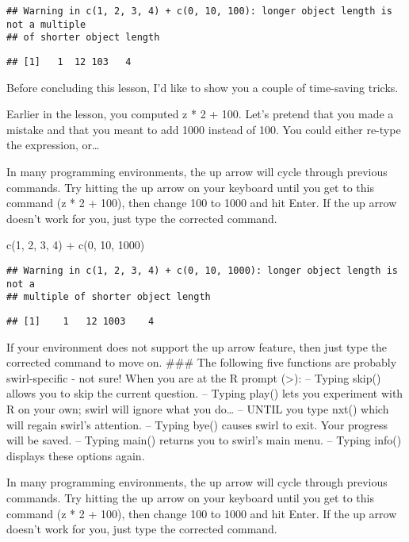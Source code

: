 \documentclass[
]{article}
\newenvironment{Shaded}{\begin{snugshade}}{\end{snugshade}}
\newcommand{\DecValTok}[1]{\textcolor[rgb]{0.00,0.00,0.81}{#1}}
\newcommand{\FunctionTok}[1]{\textcolor[rgb]{0.00,0.00,0.00}{#1}}
\newcommand{\NormalTok}[1]{#1}
\newcommand{\SpecialCharTok}[1]{\textcolor[rgb]{0.00,0.00,0.00}{#1}}
\begin{document}
\begin{verbatim}
## Warning in c(1, 2, 3, 4) + c(0, 10, 100): longer object length is not a multiple
## of shorter object length
\end{verbatim}

\begin{verbatim}
## [1]   1  12 103   4
\end{verbatim}

Before concluding this lesson, I'd like to show you a couple of
time-saving tricks.

Earlier in the lesson, you computed z * 2 + 100. Let's pretend that you
made a mistake and that you meant to add 1000 instead of 100. You could
either re-type the expression, or\ldots{}

In many programming environments, the up arrow will cycle through
previous commands. Try hitting the up arrow on your keyboard until you
get to this command (z * 2 + 100), then change 100 to 1000 and hit
Enter. If the up arrow doesn't work for you, just type the corrected
command.

\begin{Shaded}
\begin{Highlighting}[]
\FunctionTok{c}\NormalTok{(}\DecValTok{1}\NormalTok{, }\DecValTok{2}\NormalTok{, }\DecValTok{3}\NormalTok{, }\DecValTok{4}\NormalTok{) }\SpecialCharTok{+} \FunctionTok{c}\NormalTok{(}\DecValTok{0}\NormalTok{, }\DecValTok{10}\NormalTok{, }\DecValTok{1000}\NormalTok{)}
\end{Highlighting}
\end{Shaded}

\begin{verbatim}
## Warning in c(1, 2, 3, 4) + c(0, 10, 1000): longer object length is not a
## multiple of shorter object length
\end{verbatim}

\begin{verbatim}
## [1]    1   12 1003    4
\end{verbatim}

If your environment does not support the up arrow feature, then just
type the corrected command to move on. \#\#\# The following five
functions are probably swirl-specific - not sure! When you are at the R
prompt (\textgreater): -- Typing skip() allows you to skip the current
question. -- Typing play() lets you experiment with R on your own; swirl
will ignore what you do\ldots{} -- UNTIL you type nxt() which will
regain swirl's attention. -- Typing bye() causes swirl to exit. Your
progress will be saved. -- Typing main() returns you to swirl's main
menu. -- Typing info() displays these options again.

In many programming environments, the up arrow will cycle through
previous commands. Try hitting the up arrow on your keyboard until you
get to this command (z * 2 + 100), then change 100 to 1000 and hit
Enter. If the up arrow doesn't work for you, just type the corrected
command.
\end{document}
